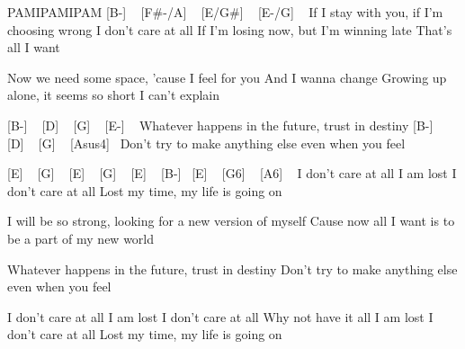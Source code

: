 PAMIPAMIPAM
[B-] ~ [F#-/A] ~ [E/G#] ~ [E-/G] ~
If I stay with you, if I'm choosing wrong
I don't care at all
If I'm losing now, but I'm winning late
That's all I want

Now we need some space, 'cause I feel for you
And I wanna change
Growing up alone, it seems so short
I can't explain

[B-] ~ [D] ~ [G] ~ [E-] ~
Whatever happens in the future, trust in destiny
[B-] ~ [D] ~ [G] ~ [Asus4]~
Don't try to make anything else even when you feel


[E]  ~ [G] ~ [E] ~ [G] ~ [E] ~ [B-] ~[E] ~ [G6] ~ [A6] ~
I don't care at all
I am lost
I don't care at all
Lost my time, my life is going on

I will be so strong, looking for a new version of myself
Cause now all I want is to be a part of my new world

Whatever happens in the future, trust in destiny
Don't try to make anything else even when you feel

I don't care at all
I am lost
I don't care at all
Why not have it all
I am lost
I don't care at all
Lost my time, my life is going on



